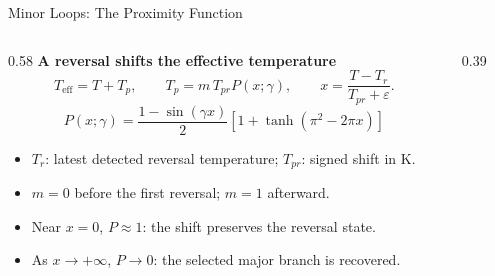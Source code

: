 \documentclass[aspectratio=169]{beamer}
\begin{document}
\begin{frame}{Minor Loops: The Proximity Function}
\begin{columns}[T,onlytextwidth]
\begin{column}{0.58\textwidth}
\footnotesize
\textbf{A reversal shifts the effective temperature}
\[
T_{\mathrm{eff}}=T+T_p,\qquad
T_p=m\,T_{pr}P(x;\gamma),\qquad
x=\frac{T-T_r}{T_{pr}+\varepsilon}.
\]
\[
\boxed{P(x;\gamma)=\frac{1-\sin(\gamma x)}{2}
\left[1+\tanh(\pi^2-2\pi x)\right]}
\]
\begin{itemize}
\setlength\itemsep{0.05cm}
\item \(T_r\): latest detected reversal temperature; \(T_{pr}\): signed shift in K.
\item \(m=0\) before the first reversal; \(m=1\) afterward.
\item Near \(x=0\), \(P\approx1\): the shift preserves the reversal state.
\item As \(x\to+\infty\), \(P\to0\): the selected major branch is recovered.
\end{itemize}
\end{column}
\begin{column}{0.39\textwidth}
\centering
{}
\end{column}
\end{columns}
\end{frame}
\end{document}

